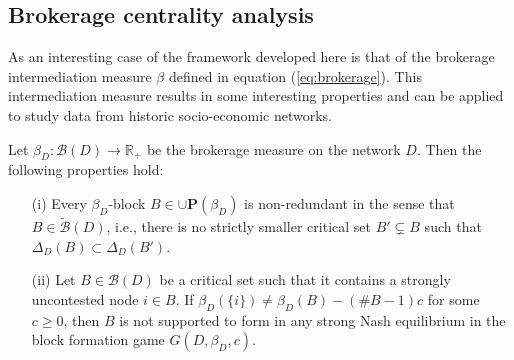 \subsection{Brokerage centrality analysis}

As an interesting case of the framework developed here is that of the brokerage intermediation measure $\beta$ defined in equation (\ref{eq:brokerage}). This intermediation measure results in some interesting properties and can be applied to study data from historic socio-economic networks.
\begin{theorem} \label{thm:beta-block}
Let $\beta_D \colon \mathcal{B} (D) \to \mathbb{R}_+$ be the brokerage measure on the network $D$. Then the following properties hold:
\begin{itemize}
\item[(i)] Every $\beta_D$-block $B \in \cup \mathbf{P} (\beta_D)$ is non-redundant in the sense that $B \in \widetilde{\mathcal{B}} (D)$, i.e., there is no strictly smaller critical set $B' \subsetneq B$ such that $\Delta_D (B) \subset \Delta_D (B')$.

\item[(ii)] Let $B \in \mathcal{B} (D)$ be a critical set such that it contains a strongly uncontested node $i \in B$. If $\beta_D (\{ i \}) \neq \beta_D (B) - (\# B-1) c$ for some $c \geqslant 0$, then $B$ is not supported to form in any strong Nash equilibrium in the block formation game $G (D, \beta_D ,c)$.
\end{itemize}
\end{theorem}
